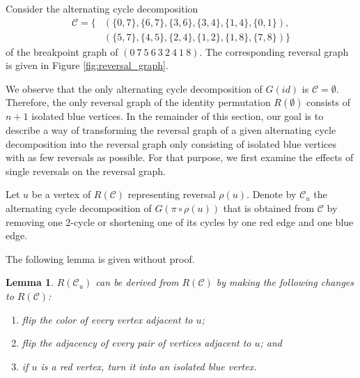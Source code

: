 \documentclass[11pt,DIV=11]{scrartcl}
\def\padding{\vspace{2em}}
\newtheorem{lemma}[theorem]{Lemma}
\theoremstyle{definition}
\theoremstyle{remark}
\begin{document}
Consider the alternating cycle decomposition
\begin{align*}
    \mathcal{C} = \{&(\{0,7\},\{6,7\},\{3,6\},\{3,4\},\{1,4\},\{0,1\}), \\
                    &(\{5,7\},\{4,5\},\{2,4\},\{1,2\},\{1,8\},\{7,8\})\}
\end{align*}
of the breakpoint graph of $(0\ 7\ 5\ 6\ 3\ 2\ 4\ 1\ 8)$. The corresponding reversal graph is given in Figure \ref{fig:reversal_graph}.\padding

We observe that the only alternating cycle decomposition of $G(id)$ is $\mathcal{C} = \emptyset$. Therefore, the only reversal graph of the identity permutation $R(\emptyset)$ consists of $n+1$ isolated blue vertices. In the remainder of this section, our goal is to describe a way of transforming the reversal graph of a given alternating cycle decomposition into the reversal graph only consisting of isolated blue vertices with as few reversals as possible. For that purpose, we first examine the effects of single reversals on the reversal graph.\padding

Let $u$ be a vertex of $R(\mathcal{C})$ representing reversal $\rho(u)$. Denote by $\mathcal{C}_u$ the alternating cycle decomposition of $G(\pi \circ \rho(u))$ that is obtained from $\mathcal{C}$ by removing one 2-cycle or shortening one of its cycles by one red edge and one blue edge.

The following lemma is given without proof.

\begin{lemma}
\label{lem:3}
$R(\mathcal{C}_u)$ can be derived from $R(\mathcal{C})$ by making the following changes to $R(\mathcal{C})$:
\begin{enumerate}
    \item flip the color of every vertex adjacent to $u$;
    \item flip the adjacency of every pair of vertices adjacent to $u$; and
    \item if $u$ is a red vertex, turn it into an isolated blue vertex.
\end{enumerate}
\end{lemma}
\end{document}
